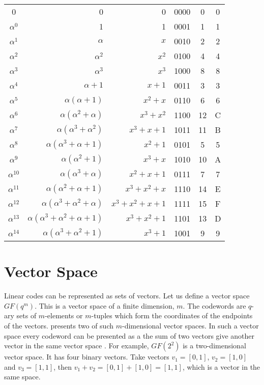 \documentclass[../main.tex]{subfiles}
\begin{document}
\begin{longtable}[c]{c | r | r | c | c | c}
        0              & 0                                     & 0              & 0000  & 0     & 0 \\
        $\alpha^0$     & 1                                     & 1              & 0001  & 1     & 1 \\
        $\alpha^1$     & $\alpha$                              & $x$            & 0010  & 2     & 2 \\
        $\alpha^2$     & $\alpha^2$                            & $x^2$          & 0100  & 4     & 4 \\
        $\alpha^3$     & $\alpha^3$                            & $x^3$          & 1000  & 8     & 8 \\
        $\alpha^4$     & $\alpha+1$                            & $x+1$          & 0011  & 3     & 3 \\
        $\alpha^5$     & $\alpha(\alpha+1)$                    & $x^2+x$        & 0110  & 6     & 6 \\
        $\alpha^6$     & $\alpha(\alpha^2+\alpha)$             & $x^3+x^2$      & 1100  & 12    & C \\
        $\alpha^7$     & $\alpha(\alpha^3+\alpha^2)$           & $x^3+x+1$      & 1011  & 11    & B \\
        $\alpha^8$     & $\alpha(\alpha^3+\alpha+1)$           & $x^2+1$        & 0101  & 5     & 5 \\
        $\alpha^9$     & $\alpha(\alpha^2+1)$                  & $x^3+x$        & 1010  & 10    & A \\
        $\alpha^{10}$  & $\alpha(\alpha^3+\alpha)$             & $x^2+x+1$      & 0111  & 7     & 7 \\
        $\alpha^{11}$  & $\alpha(\alpha^2+\alpha+1)$           & $x^3+x^2+x$    & 1110  & 14    & E \\
        $\alpha^{12}$  & $\alpha(\alpha^3+\alpha^2+\alpha)$    & $x^3+x^2+x+1$  & 1111  & 15    & F \\
        $\alpha^{13}$  & $\alpha(\alpha^3+\alpha^2+\alpha+1)$  & $x^3+x^2+1$    & 1101  & 13    & D \\
        $\alpha^{14}$  & $\alpha(\alpha^3+\alpha^2+1)$         & $x^3+1$        & 1001  & 9     & 9 \\
    \end{longtable}


    \section{Vector Space}
    Linear codes can be represented as sets of vectors. Let us define a vector space $GF(q^m)$. This is a vector space of a finite dimension, $m$. The codewords are $q$-ary sets of $m$-elements or $m$-tuples which form the coordinates of the endpoints of the vectors.  presents two of such $m$-dimensional vector spaces. In such a vector space every codeword can be presented as a the sum of two vectors give another vector in the same vector space \autocite{bose2008information}. For example, $GF(2^2)$ is a two-dimensional vector space. It has four binary vectors. Take vectors $v_1=[0,1]$, $v_2=[1,0]$ and $v_3=[1,1]$, then $v_1+v_2=[0,1]+[1,0]=[1,1]$, which is a vector in the same space.
\end{document}
